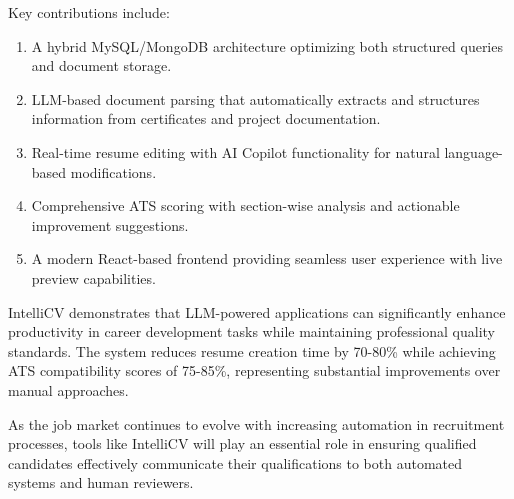\documentclass[conference]{IEEEtran}
\begin{document}
Key contributions include:
\begin{enumerate}
    \item A hybrid MySQL/MongoDB architecture optimizing both structured queries and document storage.
    \item LLM-based document parsing that automatically extracts and structures information from certificates and project documentation.
    \item Real-time resume editing with AI Copilot functionality for natural language-based modifications.
    \item Comprehensive ATS scoring with section-wise analysis and actionable improvement suggestions.
    \item A modern React-based frontend providing seamless user experience with live preview capabilities.
\end{enumerate}

IntelliCV demonstrates that LLM-powered applications can significantly enhance productivity in career development tasks while maintaining professional quality standards. The system reduces resume creation time by 70-80\% while achieving ATS compatibility scores of 75-85\%, representing substantial improvements over manual approaches.

As the job market continues to evolve with increasing automation in recruitment processes, tools like IntelliCV will play an essential role in ensuring qualified candidates effectively communicate their qualifications to both automated systems and human reviewers.
\end{document}
